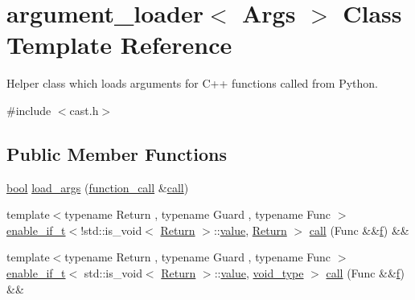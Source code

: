 \hypertarget{classargument__loader}{}\section{argument\+\_\+loader$<$ Args $>$ Class Template Reference}
\label{classargument__loader}


Helper class which loads arguments for C++ functions called from Python.  




{\ttfamily \#include $<$cast.\+h$>$}

\subsection*{Public Member Functions}
\begin{DoxyCompactItemize}
\item 
\mbox{\hyperlink{asdl_8h_af6a258d8f3ee5206d682d799316314b1}{bool}} \mbox{\hyperlink{classargument__loader_ac5cff5197a03f99f06169af9f43d6537}{load\+\_\+args}} (\mbox{\hyperlink{structfunction__call}{function\+\_\+call}} \&\mbox{\hyperlink{classargument__loader_a5d84d64cfc5643563f65b0e21310ca6c}{call}})
\item 
{\footnotesize template$<$typename Return , typename Guard , typename Func $>$ }\\\mbox{\hyperlink{detail_2common_8h_a012819c9e8b5e04872a271f50f8b8196}{enable\+\_\+if\+\_\+t}}$<$!std\+::is\+\_\+void$<$ \mbox{\hyperlink{_python-ast_8h_abdae7f49d66ce8e500825bb53aa14901}{Return}} $>$\+::\mbox{\hyperlink{_s_d_l__opengl__glext_8h_a8ad81492d410ff2ac11f754f4042150f}{value}}, \mbox{\hyperlink{_python-ast_8h_abdae7f49d66ce8e500825bb53aa14901}{Return}} $>$ \mbox{\hyperlink{classargument__loader_a5d84d64cfc5643563f65b0e21310ca6c}{call}} (Func \&\&\mbox{\hyperlink{_s_d_l__opengl__glext_8h_a691492ec0bd6383f91200e49f6ae40ed}{f}}) \&\&
\item 
{\footnotesize template$<$typename Return , typename Guard , typename Func $>$ }\\\mbox{\hyperlink{detail_2common_8h_a012819c9e8b5e04872a271f50f8b8196}{enable\+\_\+if\+\_\+t}}$<$ std\+::is\+\_\+void$<$ \mbox{\hyperlink{_python-ast_8h_abdae7f49d66ce8e500825bb53aa14901}{Return}} $>$\+::\mbox{\hyperlink{_s_d_l__opengl__glext_8h_a8ad81492d410ff2ac11f754f4042150f}{value}}, \mbox{\hyperlink{structvoid__type}{void\+\_\+type}} $>$ \mbox{\hyperlink{classargument__loader_a1671b063ca065c47975b4aa7853b403c}{call}} (Func \&\&\mbox{\hyperlink{_s_d_l__opengl__glext_8h_a691492ec0bd6383f91200e49f6ae40ed}{f}}) \&\&
\end{DoxyCompactItemize}
